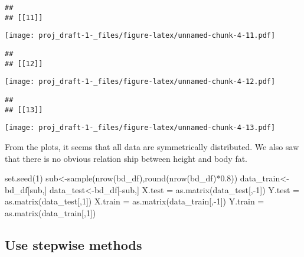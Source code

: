 \documentclass[
]{article}
\newenvironment{Shaded}{\begin{snugshade}}{\end{snugshade}}
\newcommand{\DecValTok}[1]{\textcolor[rgb]{0.00,0.00,0.81}{#1}}
\newcommand{\FloatTok}[1]{\textcolor[rgb]{0.00,0.00,0.81}{#1}}
\newcommand{\FunctionTok}[1]{\textcolor[rgb]{0.00,0.00,0.00}{#1}}
\newcommand{\NormalTok}[1]{#1}
\newcommand{\OtherTok}[1]{\textcolor[rgb]{0.56,0.35,0.01}{#1}}
\newcommand{\SpecialCharTok}[1]{\textcolor[rgb]{0.00,0.00,0.00}{#1}}
\begin{document}
\begin{verbatim}
## 
## [[11]]
\end{verbatim}

\texttt{[image: proj\_draft-1-\_files/figure-latex/unnamed-chunk-4-11.pdf]}

\begin{verbatim}
## 
## [[12]]
\end{verbatim}

\texttt{[image: proj\_draft-1-\_files/figure-latex/unnamed-chunk-4-12.pdf]}

\begin{verbatim}
## 
## [[13]]
\end{verbatim}

\texttt{[image: proj\_draft-1-\_files/figure-latex/unnamed-chunk-4-13.pdf]}

From the plots, it seems that all data are symmetrically distributed. We
also saw that there is no obvious relation ship between height and body
fat.

\begin{Shaded}
\begin{Highlighting}[]
\FunctionTok{set.seed}\NormalTok{(}\DecValTok{1}\NormalTok{)}
\NormalTok{sub}\OtherTok{\textless{}{-}}\FunctionTok{sample}\NormalTok{(}\FunctionTok{nrow}\NormalTok{(bd\_df),}\FunctionTok{round}\NormalTok{(}\FunctionTok{nrow}\NormalTok{(bd\_df)}\SpecialCharTok{*}\FloatTok{0.8}\NormalTok{))}
\NormalTok{data\_train}\OtherTok{\textless{}{-}}\NormalTok{bd\_df[sub,]}
\NormalTok{data\_test}\OtherTok{\textless{}{-}}\NormalTok{bd\_df[}\SpecialCharTok{{-}}\NormalTok{sub,]}
\NormalTok{X.test }\OtherTok{=} \FunctionTok{as.matrix}\NormalTok{(data\_test[,}\SpecialCharTok{{-}}\DecValTok{1}\NormalTok{]) }
\NormalTok{Y.test }\OtherTok{=} \FunctionTok{as.matrix}\NormalTok{(data\_test[,}\DecValTok{1}\NormalTok{])}
\NormalTok{X.train }\OtherTok{=} \FunctionTok{as.matrix}\NormalTok{(data\_train[,}\SpecialCharTok{{-}}\DecValTok{1}\NormalTok{]) }
\NormalTok{Y.train }\OtherTok{=} \FunctionTok{as.matrix}\NormalTok{(data\_train[,}\DecValTok{1}\NormalTok{])}
\end{Highlighting}
\end{Shaded}

\hypertarget{use-stepwise-methods}{%
\subsection{Use stepwise methods}\label{use-stepwise-methods}}
\end{document}
